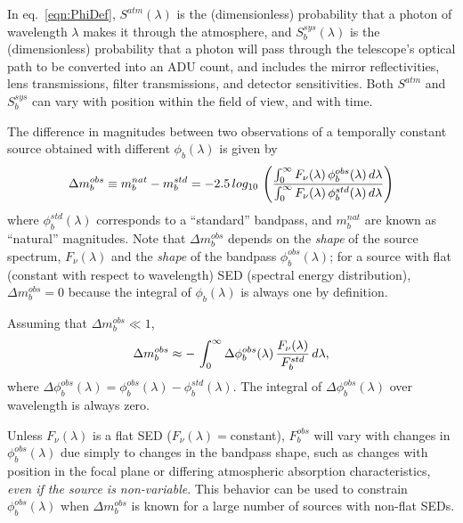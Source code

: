 \documentclass[12pt,preprint]{aastex}
\begin{document}
In eq.~\ref{eqn:PhiDef}, $S^{atm}(\lambda)$ is the (dimensionless) probability that a photon of 
wavelength $\lambda$ makes it through the atmosphere, and $S_b^{sys}(\lambda)$ is the 
(dimensionless) probability that a photon will pass through the telescope's optical path to be
converted into an ADU count, and includes the mirror reflectivities, lens transmissions, filter
transmissions, and detector sensitivities. Both $S^{atm}$ and $S_b^{sys}$ can vary with position 
within the field of view, and with time. 

The difference in magnitudes between two observations of a temporally constant source obtained with 
different $\phi_b(\lambda)$ is given by 
\begin{equation}
\label{eqn:Delta_m}
\Delta m_b^{obs}  \equiv m_b^{nat} - m_b^{std}  =  -2.5 \, log_{10} \,  \left( { \int_0^\infty {F_\nu(\lambda) \,
    \phi_b^{obs}(\lambda) \, d\lambda} \over \int_0^\infty {F_\nu(\lambda) \,
    \phi_b^{std}(\lambda) \, d\lambda}} \right)
\end{equation}
where $\phi_b^{std}(\lambda)$ corresponds to a ``standard'' bandpass, and $m_b^{nat}$ are
known as ``natural'' magnitudes. Note that $\Delta m_b^{obs}$ depends on the {\it shape} of the 
source spectrum, $F_\nu(\lambda)$ and the {\it shape} of the bandpass
$\phi_b^{obs}(\lambda)$; for a source with flat (constant with respect to wavelength) SED (spectral
energy distribution), $\Delta m_b^{obs}=0$ because the integral of $\phi_b(\lambda)$ is always one by definition. 

Assuming that $\Delta m_b^{obs} \ll 1$, 
\begin{equation}
  \Delta m_b^{obs}   \approx - \, \int_0^\infty { \Delta\phi_b^{obs}(\lambda) \,  {F_\nu(\lambda) \over F_b^{std}} \, d\lambda},
\end{equation}
where $\Delta\phi_b^{obs}(\lambda) = \phi_b^{obs}(\lambda) - \phi_b^{std}(\lambda)$. The integral of 
$\Delta\phi_b^{obs}(\lambda)$ over wavelength is always zero. 

Unless $F_\nu(\lambda)$ is a flat SED ($F_\nu(\lambda)=$constant), $F_b^{obs}$ will vary with 
changes in $\phi_b^{obs}(\lambda)$ due simply to changes in the bandpass shape,
such as changes with position in the focal plane or differing atmospheric absorption 
characteristics, {\it even if the source is non-variable}. This behavior can be used to constrain
$\phi_b^{obs}(\lambda)$ when $\Delta m_b^{obs}$ is known for a large number of sources
with non-flat SEDs. 
\end{document}
